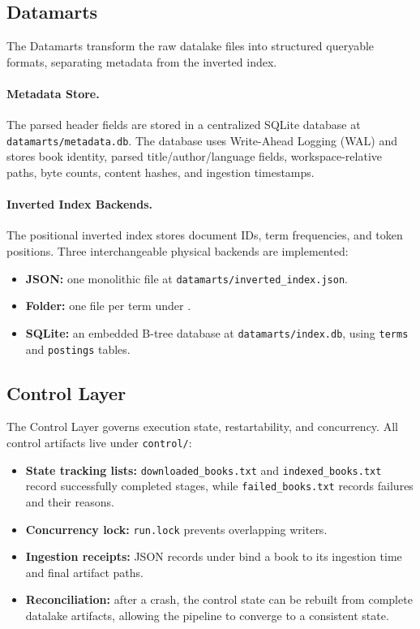 \documentclass[12pt,a4paper]{article}
\begin{document}
	\subsection{Datamarts}
	The Datamarts transform the raw datalake files into structured queryable formats,
	separating metadata from the inverted index.
	
	\paragraph{Metadata Store.}
	The parsed header fields are stored in a centralized SQLite database at
	\texttt{datamarts/metadata.db}. The database uses Write-Ahead Logging (WAL) and stores
	book identity, parsed title/author/language fields, workspace-relative paths, byte counts,
	content hashes, and ingestion timestamps.
	
	\paragraph{Inverted Index Backends.}
	The positional inverted index stores document IDs, term frequencies, and token positions.
	Three interchangeable physical backends are implemented:
	\begin{itemize}
		\item \textbf{JSON:} one monolithic file at
		\texttt{datamarts/inverted\_index.json}.
		\item \textbf{Folder:} one file per term under
		.
		\item \textbf{SQLite:} an embedded B-tree database at
		\texttt{datamarts/index.db}, using \texttt{terms} and \texttt{postings} tables.
	\end{itemize}
	
	\subsection{Control Layer}
	The Control Layer governs execution state, restartability, and concurrency. All control
	artifacts live under \texttt{control/}:
	\begin{itemize}
		\item \textbf{State tracking lists:} \texttt{downloaded\_books.txt} and
		\texttt{indexed\_books.txt} record successfully completed stages, while
		\texttt{failed\_books.txt} records failures and their reasons.
		\item \textbf{Concurrency lock:} \texttt{run.lock} prevents overlapping writers.
		\item \textbf{Ingestion receipts:} JSON records under
		 bind a book to its ingestion time and
		final artifact paths.
		\item \textbf{Reconciliation:} after a crash, the control state can be rebuilt from
		complete datalake artifacts, allowing the pipeline to converge to a consistent state.
	\end{itemize}
	
\end{document}
